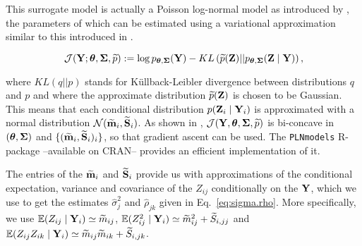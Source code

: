 This surrogate model is actually a Poisson log-normal model as introduced by \cite{AiH89}, the parameters of which can be estimated using a variational approximation similar to this introduced in \cite{CMR18}. 
\begin{linenomath} 
\begin{equation}\label{eq:LowerBound}
\mathcal{J}({\bf Y}; {\boldsymbol{\theta}}, {\boldsymbol{\Sigma}}, \widetilde{p}) := \log p_{{\boldsymbol{\theta}}, {\boldsymbol{\Sigma}}}({\bf Y}) - KL\left(\widetilde{p}({\bf Z}) || p_{{\boldsymbol{\theta}}, {\boldsymbol{\Sigma}}}({\bf Z} \mid {\bf Y})\right),
\end{equation}
\end{linenomath}
where $KL(q||p)$ stands for Küllback-Leibler divergence between distributions $q$ and $p$ and where the approximate distribution $\widetilde{p}({\bf Z})$ 
is chosen to be Gaussian. This means that each conditional distribution $p({\bf Z}_i \mid {\bf Y}_i)$ is approximated with a normal distribution $\mathcal{N}(\widetilde{\bf m}_i, \widetilde{\bf S}_i)$. As shown in \cite{CMR18}, $\mathcal{J}({\bf Y}, {\boldsymbol{\theta}}, {\boldsymbol{\Sigma}}, \widetilde{p})$ is bi-concave in $({\boldsymbol{\theta}}, {\boldsymbol{\Sigma}})$ and $\{(\widetilde{\bf m}_i, \widetilde{\bf S}_i)_i\}$, so that gradient ascent can be used. The {\tt PLNmodels} R-package --available on CRAN-- provides an efficient implementation of it.

The entries of the $\widetilde{\bf m}_i$ and $\widetilde{\bf S}_i$ provide us with approximations of the conditional expectation,  variance and covariance of the $Z_{ij}$ conditionally on the ${\bf Y}$, which we use to get the estimates $\widehat{\sigma}_j^2$ and $\widehat{\rho}_{jk}$ given in Eq.~\eqref{eq:sigma.rho}. More specifically, we use $\operatorname*{\mathbb{E}}(Z_{ij} \mid {\bf Y}_i) \simeq \widetilde{m}_{ij}$, $\operatorname*{\mathbb{E}}(Z^2_{ij} \mid {\bf Y}_i) \simeq \widetilde{m}_{ij}^2 + \widetilde{S}_{i,jj}$ and $\operatorname*{\mathbb{E}}(Z_{ij} Z_{ik} \mid {\bf Y}_i) \simeq \widetilde{m}_{ij} \widetilde{m}_{ik} + \widetilde{S}_{i, jk}$.